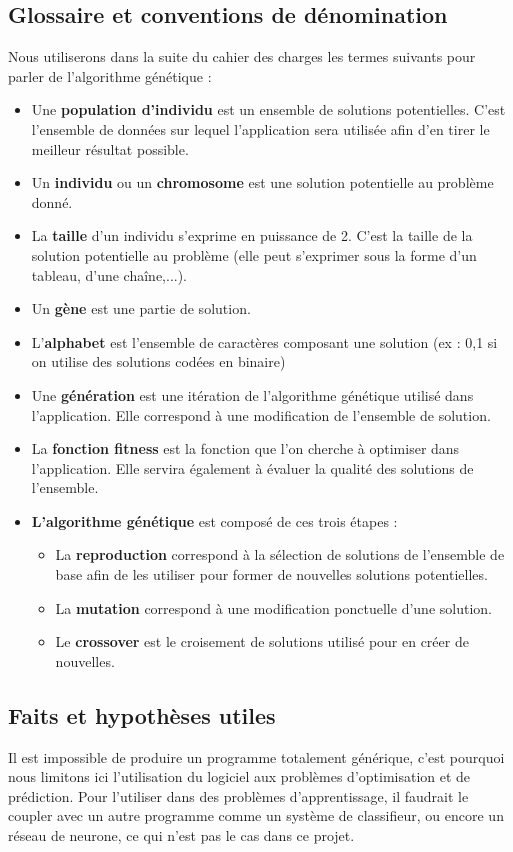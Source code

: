 \documentclass[a4paper,11pt]{article}
\begin{document}
		\subsection{Glossaire et conventions de dénomination}
			Nous utiliserons dans la suite du cahier des charges les termes suivants pour parler de l’algorithme génétique :\\
			\begin{itemize}
			\item Une \textbf{population d’individu} est un ensemble de solutions potentielles. C’est l’ensemble de données sur lequel l’application sera utilisée afin d’en tirer le meilleur résultat possible.
			\item Un \textbf{individu} ou un \textbf{chromosome} est une solution potentielle au problème donné.
			\item La \textbf{taille} d’un individu s’exprime en puissance de 2. C’est la taille de la solution potentielle au problème (elle peut s’exprimer sous la forme d’un tableau, d’une chaîne,...).
			\item Un \textbf{gène}  est une partie de solution.
			\item L’\textbf{alphabet} est l’ensemble de caractères composant une solution (ex : {0,1} si on utilise des solutions codées en binaire)
			\item Une \textbf{génération } est une itération de l’algorithme génétique utilisé dans l’application. Elle correspond à une modification de l’ensemble de solution. 
			\item La \textbf{fonction fitness} est la fonction que l’on cherche à optimiser dans l’application. Elle servira également à évaluer la qualité des solutions de l’ensemble.
			\item \textbf{L’algorithme génétique} est composé de ces trois étapes :
				\begin{itemize}
				\item La \textbf{reproduction} correspond à la sélection de solutions de l’ensemble de base afin de les utiliser pour former de nouvelles solutions potentielles.
				\item La \textbf{mutation} correspond à une modification ponctuelle d’une solution.
				\item Le \textbf{crossover} est le croisement de solutions utilisé pour en créer de nouvelles.
				\end{itemize}
			\end{itemize}
			
		\subsection{Faits et hypothèses utiles}
			Il est impossible de produire un programme totalement générique, c’est pourquoi nous limitons ici l’utilisation du logiciel aux problèmes d’optimisation et de prédiction. 
			Pour l’utiliser dans des problèmes d’apprentissage, il faudrait le coupler avec un autre programme comme un système de classifieur, ou encore un réseau de neurone, ce qui n’est pas le cas dans ce projet.
\end{document}
